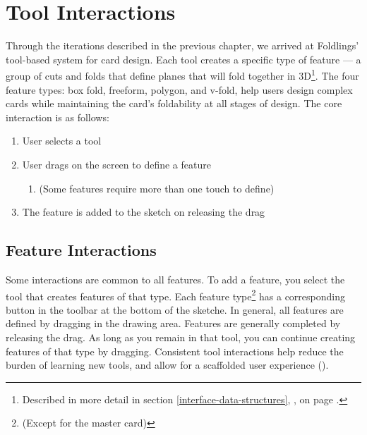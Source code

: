 \section{Tool Interactions}\label{tool-interactions}

Through the iterations described in the previous chapter, we arrived at
Foldlings' tool-based system for card design. Each tool creates a
specific type of feature --- a group of cuts and folds that define
planes that will fold together in 3D\footnote{Described in more detail
  in section \ref{interface-data-structures},
  , on page
  \pageref{interface-data-structures}.}. The four feature types: box
fold, freeform, polygon, and v-fold, help users design complex cards
while maintaining the card's foldability at all stages of design. The
core interaction is as follows:

\begin{enumerate}
\def\labelenumi{\arabic{enumi}.}
\itemsep1pt\parskip0pt
\item
  User selects a tool
\item
  User drags on the screen to define a feature

  \begin{enumerate}
  \def\labelenumii{\alph{enumii}.}
  \itemsep1pt\parskip0pt
  \item
    (Some features require more than one touch to define)
  \end{enumerate}
\item
  The feature is added to the sketch on releasing the drag
\end{enumerate}

\subsection{Feature Interactions}\label{feature-interactions}

Some interactions are common to all features. To add a feature, you
select the tool that creates features of that type. Each feature
type\footnote{(Except for the master card)} has a corresponding button
in the toolbar at the bottom of the sketche. In general, all features
are defined by dragging in the drawing area. Features are generally
completed by releasing the drag. As long as you remain in that tool, you
can continue creating features of that type by dragging. Consistent tool
interactions help reduce the burden of learning new tools, and allow for
a scaffolded user experience (\citet{wood2001scaffolding}).

